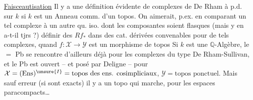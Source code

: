 
 \uline{Faisceautisation} Il y a une définition évidente de complexes de De Rham à p.d. sur $k$ si $k$ est un Anneau comm. d'un topos. On aimerait, p.ex. en comparant un tel complexe à un autre qu. iso. dont les composantes soient flasques (mais y en a-t-il tjrs ?) définir des  $Rf_*$ dans des cat. dérivées convenables pour de tels complexes, quand $f:\mathcal X\to\mathcal Y$ est un morphisme de topos  Si $k$ est une $\mathbb Q$-Algèbre, le $=$ Pb se rencontre d'ailleurs déjà pour les complexes du type De Rham-Sullivan, et le Pb est ouvert -- et posé par Deligne -- pour $\mathcal X=(\mathrm{Ens})^{\unsure{I}}=\text{topos des ens. cosimpliciaux}$, $\mathcal Y=\text{topos ponctuel}$. Mais sauf erreur (si  sont exacts) il y a un topo qui marche, pour les espaces  paracompacts\dots

